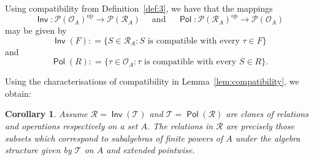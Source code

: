 \documentclass[11pt, a4paper, twoside,leqno]{amsart}
\newcommand{\defeq}{\mathrel{\mathop:}=}
\renewcommand{\O}{{\mathcal O}}
\newcommand{\R}{{\mathcal R}}
\numberwithin{equation}{section}
\theoremstyle{plain}
\newtheorem{Cor}[Thm]{Corollary}
\theoremstyle{definition}
\DeclareMathOperator{\Pol}{\mathsf{Pol}}
\DeclareMathOperator{\Inv}{\mathsf{Inv}}
\begin{document}
Using compatibility from Definition~\ref{def:3}, we have that the mappings 
\begin{equation*}
  \Inv \colon \mathscr{P} (\O_{A})^{\mathrm{op}}  \rightarrow \mathscr{P} (\R_{A}) \quad \text{ and } \quad \Pol \colon \mathscr{P} (\R_{A})^{\mathrm{op}}
  \rightarrow \mathscr{P} 
  (\O_{A})
\end{equation*}
may be given by 
\begin{equation*}
  \Inv(F) \defeq \{S \in \R_{A} : S  \text{ is compatible with every } \tau \in F\} 
\end{equation*}
and
\begin{equation*}
  \Pol(R) \defeq \{ \tau \in \O_{A} : \tau \text{ is compatible with every } S \in R \}.
\end{equation*}

Using the characterisations of compatibility in Lemma~\ref{lem:compatibility}, we obtain:
\begin{Cor}
  \label{cor:compatibility-clone-coclone}
  Assume \(\mathscr{R}
  = \Inv (\mathscr{T}
  )\) and \(\mathscr{T}
  = \Pol (\mathscr{R}
  )\)
  are clones of relations and operations respectively on a set \(A\).
  The relations in \(\mathscr{R}
  \) are precisely those subsets which
  correspond to subalgebras of finite powers of \(A\) under the algebra
  structure given by \(\mathscr{T}
  \) on \(A\) and extended pointwise.
\end{Cor}
\end{document}
